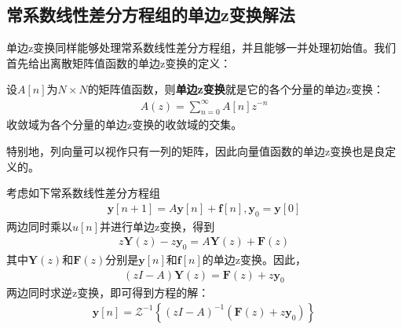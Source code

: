 \subsection{常系数线性差分方程组的单边z变换解法}\label{sub:difference_equation_system_z}

单边z变换同样能够处理常系数线性差分方程组，并且能够一并处理初始值。我们首先给出离散矩阵值函数的单边z变换的定义：

\begin{definition}[离散矩阵值函数的单边z变换]
    设$A[n]$为$N\times N$的矩阵值函数，则\textbf{单边z变换}就是它的各个分量的单边z变换：
    \begin{align*}
        A(z) = \sum_{n=0}^{\infty} A[n] z^{-n}
    \end{align*}
    收敛域为各个分量的单边z变换的收敛域的交集。
\end{definition}

特别地，列向量可以视作只有一列的矩阵，因此向量值函数的单边z变换也是良定义的。

考虑如下常系数线性差分方程组\begin{align*}
    \mathbf{y}[n+1] = A \mathbf{y}[n] + \mathbf{f}[n],\mathbf{y}_0 = \mathbf{y}[0]
\end{align*}
两边同时乘以$u[n]$并进行单边z变换，得到\begin{align*}
    z\mathbf{Y}(z) - z\mathbf{y}_0 = A \mathbf{Y}(z) + \mathbf{F}(z)
\end{align*}
其中$\mathbf{Y}(z)$和$\mathbf{F}(z)$分别是$\mathbf{y}[n]$和$\mathbf{f}[n]$的单边z变换。因此，\begin{align*}
    (zI - A) \mathbf{Y}(z) = \mathbf{F}(z) + z\mathbf{y}_0
\end{align*}
两边同时求逆z变换，即可得到方程的解：\begin{align*}
    \mathbf{y}[n] = \mathcal{Z}^{-1} \left\{(zI - A)^{-1} (\mathbf{F}(z) + z\mathbf{y}_0)\right\}\tag{$**$}
\end{align*}

